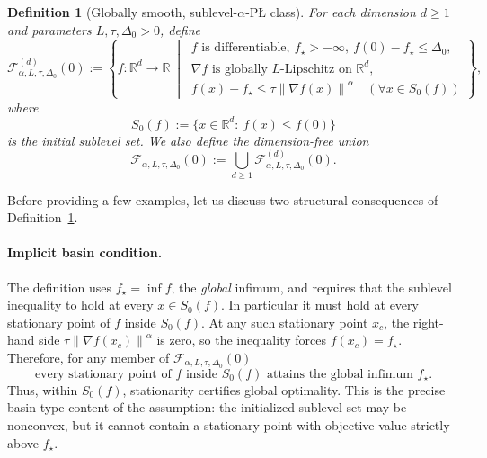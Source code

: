 \documentclass[11pt]{article}
\newtheorem{remark}[theorem]{Remark}
\newtheorem{definition}[theorem]{Definition}
\newcommand{\R}{\mathbb{R}}
\newcommand{\norm}[1]{\left\lVert #1\right\rVert}
\begin{document}
\begin{definition}[Globally smooth, sublevel-$\alpha$-P\L{} class]
\label{def:function-class}
For each dimension $d\ge 1$ and parameters $L,\tau,\Delta_0>0$, define
\[
\mathcal F^{(d)}_{\alpha,L,\tau,\Delta_0}(0)
:=
\left\{
f:\R^d\to\R \ \middle|\
\begin{array}{l}
f \text{ is differentiable},\ f_\star>-\infty,\ f(0)-f_\star\le \Delta_0,\\[0.3em]
\nabla f \text{ is globally } L\text{-Lipschitz on } \R^d,\\[0.3em]
f(x)-f_\star\le \tau \norm{\nabla f(x)}^\alpha \quad (\forall x\in S_0(f))
\end{array}
\right\},
\]
where
\[
S_0(f):=\{x\in\R^d:\ f(x)\le f(0)\}
\]
is the initial sublevel set.
We also define the dimension-free union
\[
\mathcal F_{\alpha,L,\tau,\Delta_0}(0)
:=
\bigcup_{d\ge 1}\mathcal F^{(d)}_{\alpha,L,\tau,\Delta_0}(0).
\]
\end{definition}


Before providing a few examples, let us discuss two structural consequences of Definition~\ref{def:function-class}.

\paragraph{Implicit basin condition.}
The definition uses \(f_\star=\inf f\), the \emph{global} infimum, and requires that the sublevel inequality to hold at every
\(x\in S_0(f)\). In particular it must hold at every stationary point of \(f\) inside \(S_0(f)\). At any such
stationary point \(x_c\), the right-hand side \(\tau\norm{\nabla f(x_c)}^\alpha\) is zero, so the inequality forces
\(f(x_c)=f_\star\). Therefore, for any member of \(\mathcal F_{\alpha,L,\tau,\Delta_0}(0)\) 
\begin{equation}
\label{eq:basin-condition}
\text{every stationary point of \(f\) inside \(S_0(f)\) attains the global infimum \(f_\star\).}
\end{equation}
Thus, within \(S_0(f)\), stationarity certifies global optimality. This is the precise basin-type content of the
assumption: the initialized sublevel set may be nonconvex, but it cannot contain a stationary point with objective value
strictly above \(f_\star\).
\end{document}
